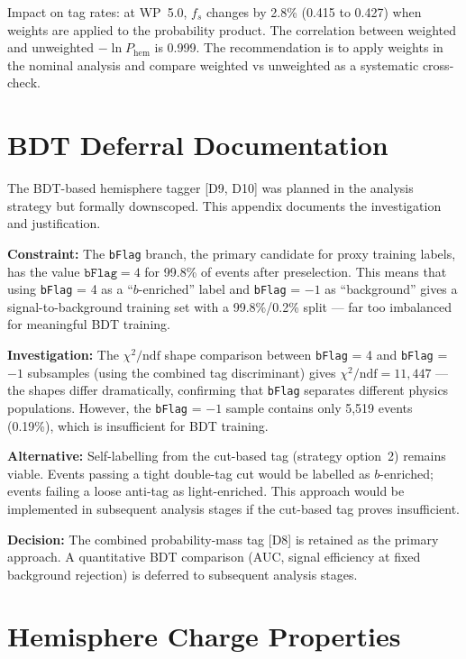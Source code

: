 \documentclass[11pt,a4paper]{article}
\begin{document}
Impact on tag rates: at WP~5.0, $f_s$ changes by 2.8\% (0.415 to 0.427) when weights
are applied to the probability product. The correlation between weighted and unweighted
$-\ln P_\mathrm{hem}$ is 0.999. The recommendation is to apply weights in the nominal
analysis and compare weighted vs unweighted as a systematic cross-check.

\section{BDT Deferral Documentation}
\label{app:bdt_deferral}

The BDT-based hemisphere tagger [D9, D10] was planned in the analysis strategy but formally
downscoped. This appendix documents the investigation and justification.

\textbf{Constraint:} The \texttt{bFlag} branch, the primary candidate for proxy training
labels, has the value $\texttt{bFlag} = 4$ for 99.8\% of events after preselection. This
means that using \texttt{bFlag} = 4 as a ``$b$-enriched'' label and \texttt{bFlag} = $-1$
as ``background'' gives a signal-to-background training set with a 99.8\%/0.2\% split ---
far too imbalanced for meaningful BDT training.

\textbf{Investigation:} The $\chi^2/\mathrm{ndf}$ shape comparison between
\texttt{bFlag} = 4 and \texttt{bFlag} = $-1$ subsamples (using the combined tag
discriminant) gives $\chi^2/\mathrm{ndf} = 11{,}447$ --- the shapes differ dramatically,
confirming that \texttt{bFlag} separates different physics populations. However, the
\texttt{bFlag} = $-1$ sample contains only 5,519 events (0.19\%), which is insufficient
for BDT training.

\textbf{Alternative:} Self-labelling from the cut-based tag (strategy option~2)
remains viable. Events passing a tight double-tag cut would be labelled as $b$-enriched;
events failing a loose anti-tag as light-enriched. This approach would be implemented in
subsequent analysis stages if the cut-based tag proves insufficient.

\textbf{Decision:} The combined probability-mass tag [D8] is retained as the primary
approach. A quantitative BDT comparison (AUC, signal efficiency at fixed background
rejection) is deferred to subsequent analysis stages.

\section{Hemisphere Charge Properties}
\label{app:hemisphere_charge}
\label{sec:jetcharge}
\end{document}
